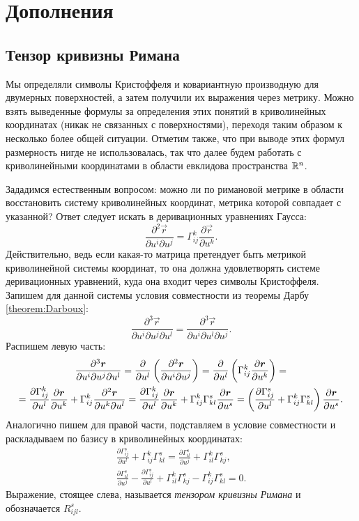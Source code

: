\section{Дополнения}

\subsection{Тензор кривизны Римана}

Мы определяли символы Кристоффеля и ковариантную производную для двумерных поверхностей, а затем получили их выражения через метрику. Можно взять выведенные формулы за определения этих понятий в криволинейных координатах (никак не связанных с поверхностями), переходя таким образом к несколько более общей ситуации. Отметим также, что при выводе этих формул размерность нигде не использовалась, так что далее будем работать с криволинейными координатами в области евклидова пространства $\mathbb{R}^n$.

Зададимся естественным вопросом: можно ли по римановой метрике в области восстановить систему криволинейных координат, метрика которой совпадает с указанной? Ответ следует искать в деривационных уравнениях Гаусса:
\[
	\frac{\partial^2\vec{r}}{\partial u^i\partial u^j} = \Gamma_{ij}^k\frac{\partial\vec{r}}{\partial u^k}.
\]
Действительно, ведь если какая-то матрица претендует быть метрикой криволинейной системы координат, то она должна удовлетворять системе деривационных уравнений, куда она входит через символы Кристоффеля. Запишем для данной системы условия совместности из теоремы Дарбу \ref{theorem:Darboux}:
\[
	\frac{\partial^3\vec{r}}{\partial u^i\partial u^j\partial u^l} = \frac{\partial^3\vec{r}}{\partial u^i\partial u^l\partial u^j}.
\]
Распишем левую часть:
\begin{multline*}
	\frac{\partial^3\boldsymbol{r}}{\partial u^i\partial u^j\partial u^l} = \frac{\partial}{\partial u^l}\left(\frac{\partial^2\boldsymbol{r}}{\partial u^i\partial u^j}\right) = \frac{\partial}{\partial u^l}\left(\Gamma_{ij}^k\frac{\partial\boldsymbol{r}}{\partial u^k}\right) =\\ = \frac{\partial\Gamma_{ij}^k}{\partial u^l}\frac{\partial\boldsymbol{r}}{\partial u^k} + \Gamma_{ij}^k\frac{\partial^2\boldsymbol{r}}{\partial u^k\partial u^l} = \frac{\partial\Gamma_{ij}^k}{\partial u^l}\frac{\partial\boldsymbol{r}}{\partial u^k} + \Gamma_{ij}^k\Gamma_{kl}^s\frac{\partial\boldsymbol{r}}{\partial u^s} = \left(\frac{\partial\Gamma_{ij}^s}{\partial u^l} + \Gamma_{ij}^k\Gamma_{kl}^s\right)\frac{\partial\boldsymbol{r}}{\partial u^s}.
\end{multline*}
Аналогично пишем для правой части, подставляем в условие совместности и раскладываем по базису в криволинейных координатах:
\begin{gather*}
	\frac{\partial\Gamma_{ij}^s}{\partial u^l} + \Gamma_{ij}^k\Gamma_{kl}^s = \frac{\partial\Gamma_{il}^s}{\partial u^j} + \Gamma_{il}^k\Gamma_{kj}^s,\\
	\frac{\partial\Gamma_{il}^s}{\partial u^j} - \frac{\partial\Gamma_{ij}^s}{\partial u^l} + \Gamma_{il}^k\Gamma_{kj}^s - \Gamma_{ij}^k\Gamma_{kl}^s = 0.
\end{gather*}
Выражение, стоящее слева, называется \textit{тензором кривизны Римана} и обозначается $R^s_{ijl}$.


